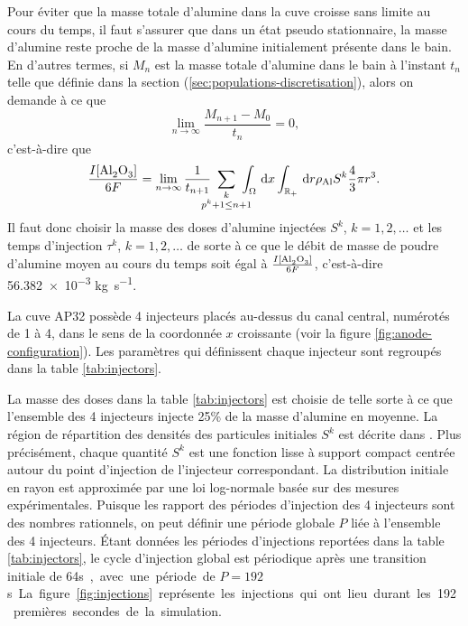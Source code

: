 Pour éviter que la masse totale d'alumine dans la cuve croisse sans
limite au cours du temps, il faut s'assurer que dans un état pseudo
stationnaire, la masse d'alumine reste proche de la masse d'alumine
initialement présente dans le bain. En d'autres termes, si $M_n$ est
la masse totale d'alumine dans le bain à l'instant $t_n$ telle que
définie dans la section (\ref{sec:populations-discretisation}), alors
on demande à ce que
\begin{equation*}
\lim_{n\to\infty} \frac{M_{n+1} - M_{0}}{t_n} = 0,
\end{equation*}
c'est-à-dire que
\begin{equation}\label{eq:injection-mass-condition}
  \frac{I[\cee{Al2O3}]}{6F}
  =\lim_{n\to \infty}\frac{1}{t_{n+1}}\ \sum_{\mathclap{\substack{k\\ p^k + 1\leq n +
        1}}}\ \int_\Omega\intd{x}\int_\rplus\intd{r}\aluminadensity S^k \frac{4}{3}\pi r^3.
\end{equation}
Il faut donc choisir la masse des doses d'alumine injectées $S^k$, $k
= 1, 2,\dots$ et les temps d'injection $\tau^k$, $k = 1,2,\dots$ de
sorte à ce que le débit de masse de poudre d'alumine moyen au cours du
temps soit égal à $\frac{I[\cee{Al2O3}]}{6F}$, c'est-à-dire
\num{56.382e-3} \si{\kilo\gram\per\second}.

La cuve AP32 possède 4 injecteurs placés au-dessus du canal central,
numérotés de 1 à 4, dans le sens de la coordonnée $x$ croissante (voir
la figure \ref{fig:anode-configuration}). Les paramètres qui
définissent chaque injecteur sont regroupés dans la table
\ref{tab:injectors}.

La masse des doses dans la table \ref{tab:injectors} est choisie de
telle sorte à ce que l'ensemble des 4 injecteurs injecte 25\% de la
masse d'alumine en moyenne. La région de répartition des densités des particules
initiales $S^k$ est décrite dans \cite{Hofer2011}. Plus précisément,
chaque quantité $S^k$ est une fonction lisse à support
compact centrée autour du point d'injection de l'injecteur
correspondant. La distribution initiale en rayon est approximée
par une loi log-normale basée sur des mesures expérimentales. Puisque
les rapport des périodes d'injection des 4 injecteurs sont des nombres
rationnels, on peut définir une période globale $P$ liée à l'ensemble des
4 injecteurs. Étant données les périodes d'injections reportées dans la table
\ref{tab:injectors}, le cycle d'injection global est périodique après une
transition initiale de \num{64}\si\second, avec une période
de $P = \num{192}$ \si\second. La figure \ref{fig:injections} représente les
injections qui ont lieu durant les \num{192} premières secondes de la
simulation.

